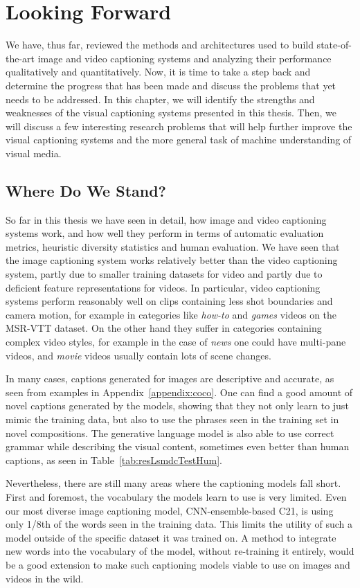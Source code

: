 \chapter{Looking Forward}
\label{chapter:discussion}
We have, thus far, reviewed the methods and architectures used to build
state-of-the-art image and video captioning systems and analyzing their
performance qualitatively and quantitatively.
Now, it is time to take a step back and determine the progress that has been
made and discuss the problems that yet needs to be addressed.
In this chapter, we will identify the strengths and weaknesses of the visual
captioning systems presented in this thesis.
Then, we will discuss a few interesting research problems that will help further
improve the visual captioning systems and the more general task of machine
understanding of visual media.  \section{Where Do We Stand?}

So far in this thesis we have seen in detail, how image and video captioning
systems work, and how well they perform in terms of automatic evaluation
metrics, heuristic diversity statistics and human evaluation.
We have seen that the image captioning system works relatively better than the
video captioning system, partly due to smaller training datasets for video and
partly due to deficient feature representations for videos.
In particular, video captioning systems perform reasonably well on clips
containing less shot boundaries and camera motion, for example in categories
like \emph{how-to} and \emph{games} videos on the MSR-VTT dataset.
On the other hand they suffer in categories containing complex video styles, for
example in the case of \emph{news} one could have multi-pane videos, and
\emph{movie} videos usually contain lots of scene changes.

In many cases, captions generated for images are descriptive and accurate, as
seen from examples in Appendix~\ref{appendix:coco}.
One can find a good amount of novel captions generated by the models, showing
that they not only learn to just mimic the training data, but also to use the
phrases seen in the training set in novel compositions.
The generative language model is also able to use correct grammar while
describing the visual content, sometimes even better than human captions, as
seen in Table~\ref{tab:resLsmdcTestHum}.

Nevertheless, there are still many areas where the captioning models fall short.
First and foremost, the vocabulary the models learn to use is very limited.
Even our most diverse image captioning model, CNN-ensemble-based C21,
is using only 1/8th of the words seen in the training data. 
This limits the utility of such a model outside of the specific dataset it was
trained on.
A method to integrate new words into the vocabulary of the model, without
re-training it entirely, would be a good extension to make such captioning
models viable to use on images and videos in the wild.

